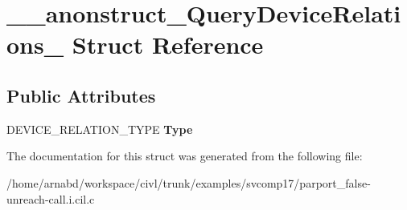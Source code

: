 \hypertarget{struct____anonstruct__QueryDeviceRelations__70}{}\section{\+\_\+\+\_\+anonstruct\+\_\+\+Query\+Device\+Relations\+\_ Struct Reference}
\label{struct____anonstruct__QueryDeviceRelations__70}
\subsection*{Public Attributes}
\begin{DoxyCompactItemize}
\item 
\hypertarget{struct____anonstruct__QueryDeviceRelations__70_a9a16ed252e9dbdf21b68728be79c47bc}{}D\+E\+V\+I\+C\+E\+\_\+\+R\+E\+L\+A\+T\+I\+O\+N\+\_\+\+T\+Y\+P\+E {\bfseries Type}\label{struct____anonstruct__QueryDeviceRelations__70_a9a16ed252e9dbdf21b68728be79c47bc}

\end{DoxyCompactItemize}


The documentation for this struct was generated from the following file\+:\begin{DoxyCompactItemize}
\item 
/home/arnabd/workspace/civl/trunk/examples/svcomp17/parport\+\_\+false-\/unreach-\/call.\+i.\+cil.\+c\end{DoxyCompactItemize}
